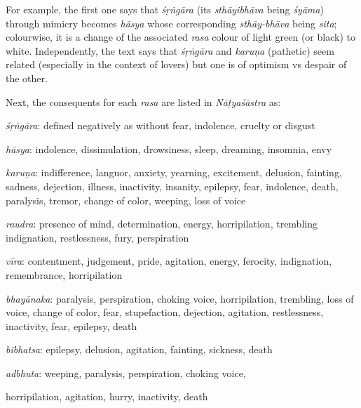 For example, the first one says that \textsl{śṛṅgāra} (its \textsl{sthāyibhāva} being \textsl{śyāma}) through mimicry becomes \textsl{hāsya} whose corresponding \textsl{sthāy-bhāva} being \textsl{sita}; colourwise, it is a change of the associated \textsl{rasa} colour of light green (or black) to white. Independently, the text says that \textsl{śṛṅgāra} and \textsl{karuṇa} (pathetic) seem related (especially in the context of lovers) but one is of optimism vs despair of the other. 

Next, the consequents for each \textsl{rasa} are listed in \textsl{Nāṭyaśāstra} as: 

\textsl{śṛṅgāra}: defined negatively as without fear, indolence, cruelty or disgust

\textsl{hāsya}: indolence, dissimulation, drowsiness, sleep, dreaming, insomnia, envy

\textsl{karuṇa}: indifference, languor, anxiety, yearning, excitement, delusion, fainting, sadness, dejection, illness, inactivity, insanity, epilepsy, fear, indolence, death, paralysis, tremor, change of color, weeping, loss of voice

\textsl{raudra}: presence of mind, determination, energy, horripilation, trembling indignation, restlessness, fury, perspiration

\textsl{vīra}: contentment, judgement, pride, agitation, energy, ferocity, indignation, remembrance, horripilation

\textsl{bhayānaka}: paralysis, perspiration, choking voice, horripilation, trembling, loss of voice, change of color, fear, stupefaction, dejection, agitation, restlessness, inactivity, fear, epilepsy, death

\textsl{bībhatsa}: epilepsy, delusion, agitation, fainting, sickness, death

\textsl{adbhuta}: weeping, paralysis, perspiration, choking voice, 

horripilation, agitation, hurry, inactivity, death

